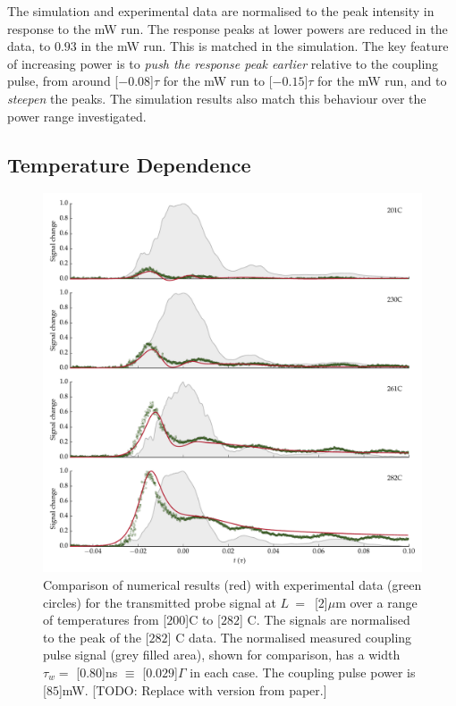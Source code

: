     The simulation and experimental data are normalised to the peak intensity in
    response to the \unit[100]{mW} run. The response peaks at lower powers are
    reduced in the data, to $0.93$ in the \unit[20]{mW} run. This is matched in
    the simulation. The key feature of increasing power is to \textit{push the
    response peak earlier} relative to the coupling pulse, from around
    \unit[$-0.08$]{$\tau$} for the \unit[20]{mW} run to \unit[$-0.15$]{$\tau$}
    for the \unit[100]{mW} run, and to \textit{steepen} the peaks. The
    simulation results also match this behaviour over the power range
    investigated.

  \subsection{Temperature Dependence}

    \begin{figure}[p]
    \includegraphics[width=\linewidth]{figs/06_simultons/mb_vee2g_exp_plot_temp_282_fig1.pdf}
    \caption{
    Comparison of numerical results (red) with experimental data (green circles)
    for the transmitted probe signal at $L~=$~\unit[$2$]{$\mu$m} over a range of
    temperatures from \unit[$200$]{\textdegree C} to \unit[$282$]{\textdegree
    C}. The signals are normalised to the peak of the \unit[$282$]{\textdegree
    C} data. The normalised measured coupling pulse signal (grey filled area),
    shown for comparison, has a width $\tau_w = $ \unit[$0.80$]{ns} $ \equiv $
    \unit[$0.029$]{$\Gamma$} in each case. The coupling pulse power is
    \unit[$85$]{mW}.
    [TODO: Replace with version from paper.]
    } 
    \label{fig:exp_result_temp_dep} 
    \end{figure}

